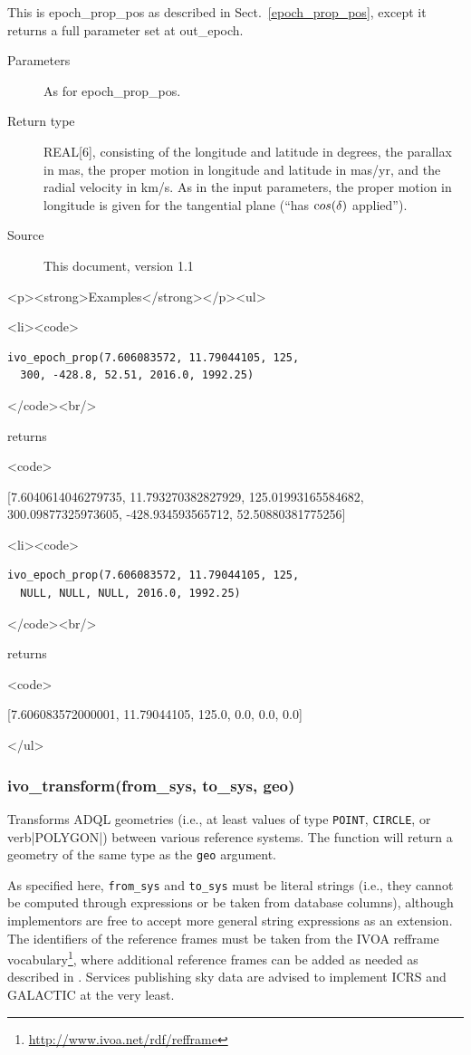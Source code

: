 \documentclass[11pt,a4paper]{ivoa}
\newenvironment{examples}%
{\begin{html}<p><strong>Examples</strong></p><ul>\end{html}%
  \def\example{\begin{html}<li><code>\end{html}}%
  \def\becomes{\begin{html}</code><br/>\end{html} returns
    \begin{html}<code>\end{html}}%
  \def\done##1.{\begin{html}</code> <span class="explanation">\end{html}
    ##1
    \begin{html}</span></li>\end{html}}}%
{\begin{html}</ul>\end{html}}
\begin{document}
This is epoch\_prop\_pos as described in Sect.~\ref{epoch_prop_pos},
except it returns a full parameter set at out\_epoch.

\begin{description}
\item[Parameters]
  As for epoch\_prop\_pos.

\item[Return type] REAL[6], consisting of the longitude and latitude in
degrees, the parallax in mas, the proper motion in longitude and
latitude in mas/yr, and the radial velocity in km/s.  As in the input
parameters, the proper motion in longitude is given for the tangential
plane (``has ${\textrm cos}(\delta)$ applied'').

\item[Source] This document, version 1.1
\end{description}

\begin{examples}
\example \begin{lstlisting}
ivo_epoch_prop(7.606083572, 11.79044105, 125,
  300, -428.8, 52.51, 2016.0, 1992.25)
\end{lstlisting}
\becomes [7.6040614046279735, 11.793270382827929, 125.01993165584682,\\
300.09877325973605, -428.934593565712, 52.50880381775256]
\example \begin{lstlisting}
ivo_epoch_prop(7.606083572, 11.79044105, 125,
  NULL, NULL, NULL, 2016.0, 1992.25)
\end{lstlisting}
\becomes [7.606083572000001, 11.79044105, 125.0, 0.0, 0.0, 0.0]
\end{examples}


\subsubsection{ivo\_transform(from\_sys, to\_sys, geo)}

Transforms ADQL geometries (i.e., at least values of type \verb|POINT|,
\verb|CIRCLE|, or verb|POLYGON|) between various reference systems. The
function will return a geometry of the same type as the \verb|geo|
argument.

As specified here, \verb|from_sys| and \verb|to_sys| must be literal
strings (i.e., they cannot be computed through expressions or be taken
from database columns), although implementors are free to accept more
general string expressions as an extension.  The identifiers of the
reference frames must be taken from the IVOA refframe
vocabulary\footnote{\url{http://www.ivoa.net/rdf/refframe}}, where
additional reference frames can be added as needed as described in
\citet{2023ivoa.spec.0206D}.  Services publishing sky data are advised
to implement ICRS and GALACTIC at the very least.
\end{document}
